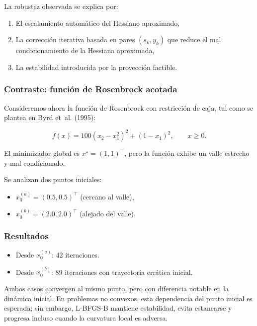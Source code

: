 \documentclass[
  spanish,
  us-letterpaper,
]{scrreprt}
\providecommand{\tightlist}{%
  \setlength{\itemsep}{0pt}\setlength{\parskip}{0pt}}
\numberwithin{equation}{section}
\begin{document}
La robustez observada se explica por:

\begin{enumerate}
\def\labelenumi{\arabic{enumi}.}
\tightlist
\item
  El escalamiento automático del Hessiano aproximado,
\item
  La corrección iterativa basada en pares \((s_k, y_k)\) que reduce el
  mal condicionamiento de la Hessiana aproximada,
\item
  La estabilidad introducida por la proyección factible.
\end{enumerate}

\subsubsection{Contraste: función de Rosenbrock
acotada}\label{contraste-funciuxf3n-de-rosenbrock-acotada}

Consideremos ahora la función de Rosenbrock con restricción de caja, tal
como se plantea en Byrd et~al. (1995):

\[
f(x) = 100(x_2 - x_1^2)^2 + (1 - x_1)^2,
\qquad
x \ge 0.
\]

El minimizador global es \(x^\star = (1,1)^\top\), pero la función
exhibe un valle estrecho y mal condicionado.

Se analizan dos puntos iniciales:

\begin{itemize}
\tightlist
\item
  \(x_0^{(a)} = (0.5,0.5)^\top\) (cercano al valle),
\item
  \(x_0^{(b)} = (2.0,2.0)^\top\) (alejado del valle).
\end{itemize}

\subsubsection{Resultados}\label{resultados}

\begin{itemize}
\tightlist
\item
  Desde \(x_0^{(a)}\): 42 iteraciones.
\item
  Desde \(x_0^{(b)}\): 89 iteraciones con trayectoria errática inicial.
\end{itemize}

Ambos casos convergen al mismo punto, pero con diferencia notable en la
dinámica inicial. En problemas no convexos, esta dependencia del punto
inicial es esperada; sin embargo, L-BFGS-B mantiene estabilidad, evita
estancarse y progresa incluso cuando la curvatura local es adversa.
\end{document}
